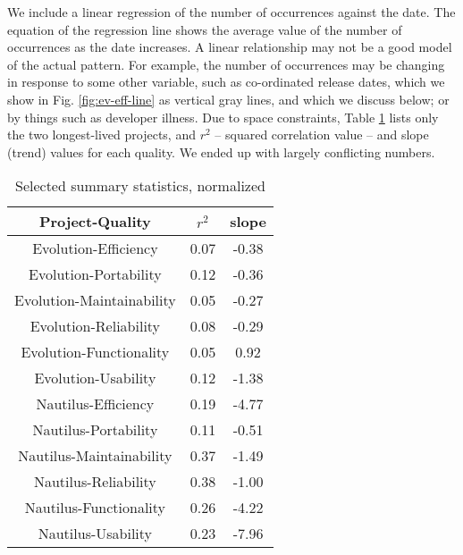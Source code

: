 \documentclass[conference, compsoc]{IEEEtran}
\begin{document}
We include a linear regression of the number of occurrences against the date. The equation of the regression line shows the average value of the number of occurrences as the date increases. A linear relationship may not be a good model of the actual pattern. For example, the number of occurrences may be changing in response to some other variable, such as co-ordinated release dates, which we show in Fig. \ref{fig:ev-eff-line} as vertical gray lines, and which we discuss below; or by things such as developer illness. Due to space constraints, Table \ref{tbl:summary} lists only the two longest-lived projects, and $r^2$  -- squared correlation value -- and slope (trend) values for each quality. We ended up with largely conflicting numbers. 

\begin{table}
	\caption{Selected summary statistics, normalized}
	\centering
	\label{tbl:summary}
\begin{tabular}{|c|c|c|}
\hline
\rowcolor[gray]{.9} 
Project-Quality &  $r^2$ &  slope \\ \hline
Evolution-Efficiency & 0.07 & -0.38 \\
Evolution-Portability & 0.12 & -0.36 \\
Evolution-Maintainability & 0.05 & -0.27 \\
Evolution-Reliability & 0.08 & -0.29 \\
Evolution-Functionality & 0.05 & 0.92 \\
Evolution-Usability & 0.12 & -1.38 \\
Nautilus-Efficiency & 0.19 & -4.77 \\
Nautilus-Portability & 0.11 & -0.51 \\
Nautilus-Maintainability & 0.37 & -1.49 \\
Nautilus-Reliability & 0.38 & -1.00 \\
Nautilus-Functionality & 0.26 & -4.22 \\
Nautilus-Usability & 0.23 & -7.96 \\
\hline
\end{tabular}
\end{table}
\end{document}
